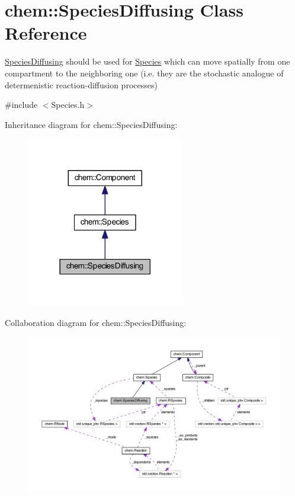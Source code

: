 \hypertarget{classchem_1_1SpeciesDiffusing}{\section{chem\-:\-:Species\-Diffusing Class Reference}
\label{classchem_1_1SpeciesDiffusing}
}


\hyperlink{classchem_1_1SpeciesDiffusing}{Species\-Diffusing} should be used for \hyperlink{classchem_1_1Species}{Species} which can move spatially from one compartment to the neighboring one (i.\-e. they are the stochastic analogue of determenistic reaction-\/diffusion processes)  




{\ttfamily \#include $<$Species.\-h$>$}



Inheritance diagram for chem\-:\-:Species\-Diffusing\-:
\nopagebreak
\begin{figure}[H]
\begin{center}
\leavevmode
\includegraphics[width=194pt]{classchem_1_1SpeciesDiffusing__inherit__graph}
\end{center}
\end{figure}


Collaboration diagram for chem\-:\-:Species\-Diffusing\-:
\nopagebreak
\begin{figure}[H]
\begin{center}
\leavevmode
\includegraphics[width=350pt]{classchem_1_1SpeciesDiffusing__coll__graph}
\end{center}
\end{figure}
